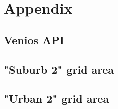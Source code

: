 \documentclass[a4paper]{report}
\begin{document}


\chapter{Appendix}

\section{Venios API}\label{sec:appendix:api}



\section{"Suburb 2" grid area}\label{sec:appendix:suburb2}



\section{"Urban 2" grid area}\label{sec:appendix:urban2}



\printbibliography
\end{document}
